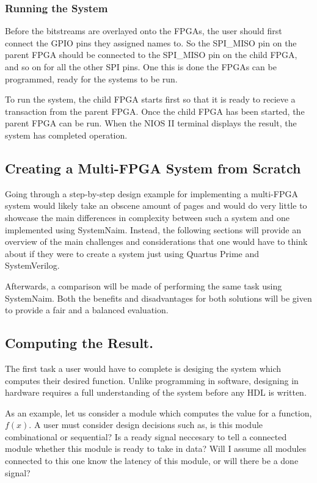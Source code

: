 \subsubsection{Running the System}

Before the bitstreams are overlayed onto the FPGAs, the user should first connect the GPIO pins they assigned names to. So the SPI\_MISO pin on the parent FPGA should be connected to the SPI\_MISO pin on the child FPGA, and so on for all the other SPI pins. One this is done the FPGAs can be programmed, ready for the systems to be run.

To run the system, the child FPGA starts first so that it is ready to recieve a transaction from the parent FPGA. Once the child FPGA has been started, the parent FPGA can be run. When the NIOS II terminal displays the result, the system has completed operation.

\subsection{Creating a Multi-FPGA System from Scratch}
\label{sec:scratch}

Going through a step-by-step design example for implementing a multi-FPGA system would likely take an obscene amount of pages and would do very little to showcase the main differences in complexity between such a system and one implemented using SystemNaim. Instead, the following sections will provide an overview of the main challenges and considerations that one would have to think about if they were to create a system just using Quartus Prime and SystemVerilog.

Afterwards, a comparison will be made of performing the same task using SystemNaim. Both the benefits and disadvantages for both solutions will be given to provide a fair and a balanced evaluation.

\subsection{Computing the Result.}
\label{sec:dedicated_hardware_computation}

The first task a user would have to complete is desiging the system which computes their desired function. Unlike programming in software, designing in hardware requires a full understanding of the system before any HDL is written.

As an example, let us consider a module which computes the value for a function, $f(x)$. A user must consider design decisions such as, is this module combinational or sequential? Is a ready signal neccesary to tell a connected module whether this module is ready to take in data? Will I assume all modules connected to this one know the latency of this module, or will there be a done signal?

